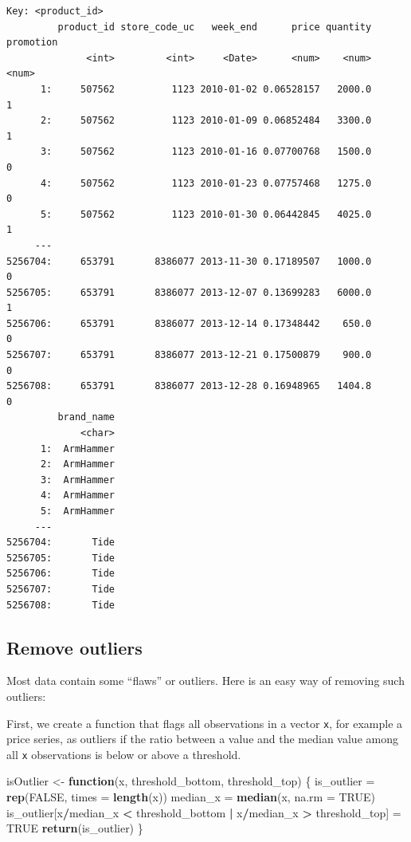 \documentclass[
]{article}
\newenvironment{Shaded}{\begin{snugshade}}{\end{snugshade}}
\newcommand{\AttributeTok}[1]{\textcolor[rgb]{0.13,0.29,0.53}{#1}}
\newcommand{\ConstantTok}[1]{\textcolor[rgb]{0.56,0.35,0.01}{#1}}
\newcommand{\ControlFlowTok}[1]{\textcolor[rgb]{0.13,0.29,0.53}{\textbf{#1}}}
\newcommand{\FunctionTok}[1]{\textcolor[rgb]{0.13,0.29,0.53}{\textbf{#1}}}
\newcommand{\NormalTok}[1]{#1}
\newcommand{\OtherTok}[1]{\textcolor[rgb]{0.56,0.35,0.01}{#1}}
\newcommand{\SpecialCharTok}[1]{\textcolor[rgb]{0.81,0.36,0.00}{\textbf{#1}}}
\begin{document}
\begin{verbatim}
Key: <product_id>
         product_id store_code_uc   week_end      price quantity promotion
              <int>         <int>     <Date>      <num>    <num>     <num>
      1:     507562          1123 2010-01-02 0.06528157   2000.0         1
      2:     507562          1123 2010-01-09 0.06852484   3300.0         1
      3:     507562          1123 2010-01-16 0.07700768   1500.0         0
      4:     507562          1123 2010-01-23 0.07757468   1275.0         0
      5:     507562          1123 2010-01-30 0.06442845   4025.0         1
     ---                                                                  
5256704:     653791       8386077 2013-11-30 0.17189507   1000.0         0
5256705:     653791       8386077 2013-12-07 0.13699283   6000.0         1
5256706:     653791       8386077 2013-12-14 0.17348442    650.0         0
5256707:     653791       8386077 2013-12-21 0.17500879    900.0         0
5256708:     653791       8386077 2013-12-28 0.16948965   1404.8         0
         brand_name
             <char>
      1:  ArmHammer
      2:  ArmHammer
      3:  ArmHammer
      4:  ArmHammer
      5:  ArmHammer
     ---           
5256704:       Tide
5256705:       Tide
5256706:       Tide
5256707:       Tide
5256708:       Tide
\end{verbatim}

\subsection{Remove outliers}\label{remove-outliers}

Most data contain some ``flaws'' or outliers. Here is an easy way of
removing such outliers:

First, we create a function that flags all observations in a vector
\texttt{x}, for example a price series, as outliers if the ratio between
a value and the median value among all \texttt{x} observations is below
or above a threshold.

\begin{Shaded}
\begin{Highlighting}[]
\NormalTok{isOutlier }\OtherTok{\textless{}{-}} \ControlFlowTok{function}\NormalTok{(x, threshold\_bottom, threshold\_top) \{}
\NormalTok{   is\_outlier }\OtherTok{=} \FunctionTok{rep}\NormalTok{(}\ConstantTok{FALSE}\NormalTok{, }\AttributeTok{times =} \FunctionTok{length}\NormalTok{(x))}
\NormalTok{   median\_x   }\OtherTok{=} \FunctionTok{median}\NormalTok{(x, }\AttributeTok{na.rm =} \ConstantTok{TRUE}\NormalTok{)}
\NormalTok{   is\_outlier[x}\SpecialCharTok{/}\NormalTok{median\_x }\SpecialCharTok{\textless{}}\NormalTok{ threshold\_bottom }\SpecialCharTok{|}\NormalTok{ x}\SpecialCharTok{/}\NormalTok{median\_x }\SpecialCharTok{\textgreater{}}\NormalTok{ threshold\_top] }\OtherTok{=} \ConstantTok{TRUE}
   \FunctionTok{return}\NormalTok{(is\_outlier)}
\NormalTok{\}}
\end{Highlighting}
\end{Shaded}
\end{document}
